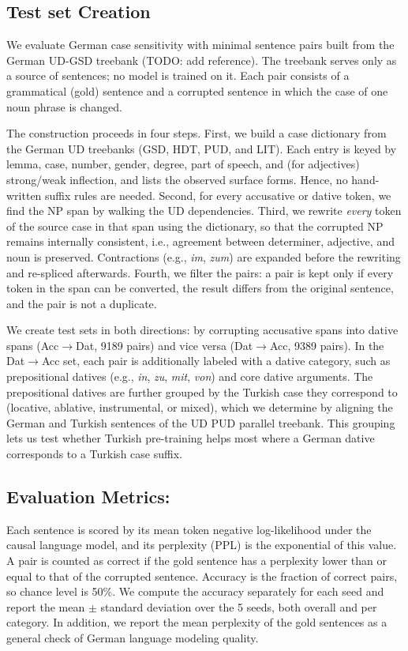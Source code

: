 \documentclass[11pt]{article}
\begin{document}
\subsection{Test set Creation}

We evaluate German case sensitivity with minimal sentence pairs built from the German UD-GSD treebank (TODO: add reference). The treebank serves only as a source of sentences; no model is trained on it. Each pair consists of a grammatical (gold) sentence and a corrupted sentence in which the case of one noun phrase is changed.

The construction proceeds in four steps. First, we build a case dictionary from the German UD treebanks (GSD, HDT, PUD, and LIT). Each entry is keyed by lemma, case, number, gender, degree, part of speech, and (for adjectives) strong/weak inflection, and lists the observed surface forms. Hence, no hand-written suffix rules are needed. Second, for every accusative or dative token, we find the NP span by walking the UD dependencies. Third, we rewrite \emph{every} token of the source case in that span using the dictionary, so that the corrupted NP remains internally consistent, i.e., agreement between determiner, adjective, and noun is preserved. Contractions (e.g., \textit{im}, \textit{zum}) are expanded before the rewriting and re-spliced afterwards. Fourth, we filter the pairs: a pair is kept only if every token in the span can be converted, the result differs from the original sentence, and the pair is not a duplicate.

We create test sets in both directions: by corrupting accusative spans into dative spans (Acc$\rightarrow$Dat, \num{9189} pairs) and vice versa (Dat$\rightarrow$Acc, \num{9389} pairs). In the Dat$\rightarrow$Acc set, each pair is additionally labeled with a dative category, such as prepositional datives (e.g., \textit{in}, \textit{zu}, \textit{mit}, \textit{von}) and core dative arguments. The prepositional datives are further grouped by the Turkish case they correspond to (locative, ablative, instrumental, or mixed), which we determine by aligning the German and Turkish sentences of the UD PUD parallel treebank. This grouping lets us test whether Turkish pre-training helps most where a German dative corresponds to a Turkish case suffix.

\subsection{Evaluation Metrics:}
Each sentence is scored by its mean token negative log-likelihood under the causal language model, and its perplexity (PPL) is the exponential of this value. A pair is counted as correct if the gold sentence has a perplexity lower than or equal to that of the corrupted sentence. Accuracy is the fraction of correct pairs, so chance level is 50\%. We compute the accuracy separately for each seed and report the mean $\pm$ standard deviation over the 5 seeds, both overall and per category. In addition, we report the mean perplexity of the gold sentences as a general check of German language modeling quality.
\end{document}
